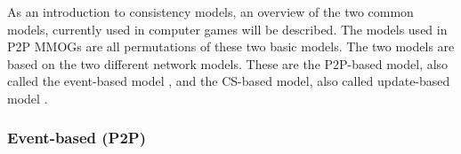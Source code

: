 \documentclass[10pt,a4paper,journal,cspaper,compsoc]{IEEEtran}
\begin{document}
As an introduction to consistency models, an overview of the two common models, currently used in computer games will be described. The models used
in P2P MMOGs are all permutations of these two basic models. The two models are based on the two different network models. These are the P2P-based
model, also called the event-based model \cite{p2p_cm_aoe}, and the \ac{CS}-based model, also called update-based model \cite{unreal_networking}.

\subsubsection{Event-based (P2P)}
\label{classic_cs_event_based}

\begin{figure}[htbp]
\centering {}

\end{figure}
\end{document}

